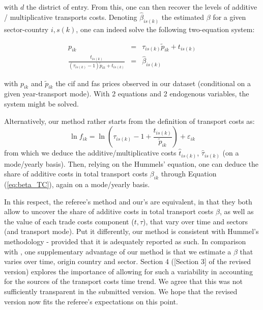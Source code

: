 \documentclass[a4paper,11pt]{article}
\begin{document}
\begin{itemize}
     \noindent with $d$ the district of entry. From this, one can then recover the levels of additive / multiplicative transports costs. Denoting $\widehat{\beta}_{is(k)}$ the estimated $\beta$ for a given sector-country $i,s(k)$, one can indeed solve the following two-equation system:

\begin{eqnarray}
p_{ik} &=& \tau_{is(k)}\widetilde{p}_{ik} +t_{is(k)} \label{eq:system1}\\
\frac{t_{is(k)}}{(\tau_{is(k)}-1)\widetilde{p}_{ik}+ t_{is(k)}} &=& \widehat{\beta}_{is(k)}  \label{eq:system2}
\end{eqnarray}

\noindent with $p_{ik}$ and $\widetilde{p}_{ik}$ the cif and fas prices observed in our dataset (conditional on a given year-transport mode). With 2 equations and 2 endogenous variables, the system might be solved.

     Alternatively, our method rather starts from the definition of transport costs as:
     $$\ln f_{ik} = \ln\left(\tau_{is(k)} -1 + \frac{t_{is(k)}}{\widetilde{p}_{ik}}\right) +\varepsilon_{ik}$$
from which we deduce the additive/multiplicative costs $\widehat{t}_{is(k)}$, $\widehat{\tau}_{is(k)}$ (on a mode/yearly basis). Then, relying on the Hummels' equation, one can deduce the share of additive costs in total transport costs $\beta_{ik}$ through Equation (\ref{eq:beta_TC}), again on a mode/yearly basis.

In this respect, the referee's method and our's are equivalent, in that they both allow to uncover the share of additive costs in total transport costs $\beta$, as well as the value of each trade costs component ($t,\tau$), that vary over time and sectors (and transport mode). Put it differently, our method is consistent with Hummel's methodology - provided that it is adequately reported as such. In comparison with \cite{hummels2007}, one supplementary advantage of our method is that we estimate a $\beta$ that varies over time, origin country and sector. Section 4 ([Section 3] of the revised version) explores the importance of allowing for such a variability in accounting for the sources of the transport costs time trend. We agree that this was not sufficiently transparent in the submitted version. We hope that the revised version now fits the referee's expectations on this point.

\end{itemize}
\end{document}
